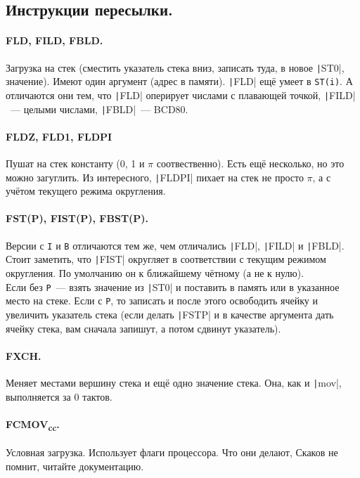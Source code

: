 \documentclass{article}
\begin{document}
    \subsection{Инструкции пересылки.}
    \paragraph{FLD, FILD, FBLD.}
    Загрузка на стек (сместить указатель стека вниз, записать туда, в новое \texttt|ST0|, значение). Имеют один аргумент (адрес в памяти). \texttt|FLD| ещё умеет в \Verb|ST(i)|. А отличаются они тем, что \texttt|FLD| оперирует числами с плавающей точкой, \texttt|FILD|~--- целыми числами, \texttt|FBLD|~--- BCD80.
    \paragraph{FLDZ, FLD1, FLDPI}
    Пушат на стек константу (0, 1 и $\pi$ соотвественно). Есть ещё несколько, но это можно загуглить. Из интересного, \texttt|FLDPI| пихает на стек не просто $\pi$, а с учётом текущего режима округления.
    \paragraph{FST(P), FIST(P), FBST(P).}
    Версии с \Verb|I| и \Verb|B| отличаются тем же, чем отличались \texttt|FLD|, \texttt|FILD| и \texttt|FBLD|. Стоит заметить, что \texttt|FIST| округляет в соответствии с текущим режимом округления. По умолчанию он к ближайшему чётному (а не к нулю).\\
    Если без \Verb|P|~--- взять значение из \texttt|ST0| и поставить в память или в указанное место на стеке. Если с \Verb|P|, то записать и после этого освободить ячейку и увеличить указатель стека (если делать \texttt|FSTP| и в качестве аргумента дать ячейку стека, вам сначала запишут, а потом сдвинут указатель).
    \paragraph{FXCH.}
    Меняет местами вершину стека и ещё одно значение стека. Она, как и \texttt|mov|, выполняется за 0 тактов.
    \paragraph{FCMOV\textsubscript{cc}.}
    Условная загрузка. Использует флаги процессора. Что они делают, Скаков не помнит, читайте документацию.
\end{document}
